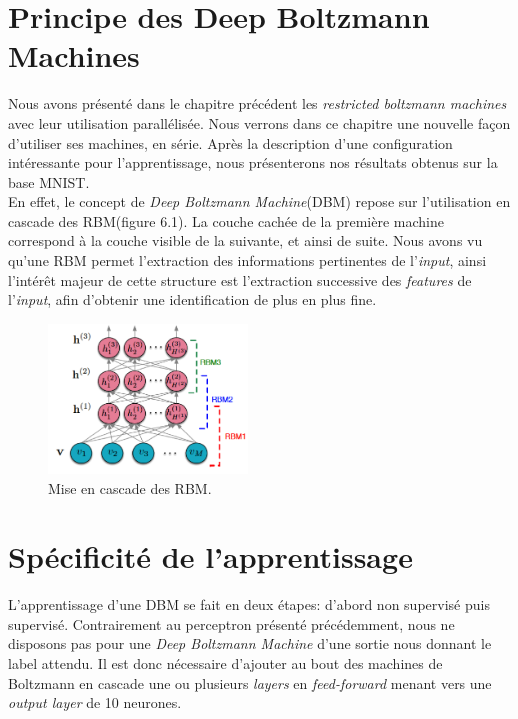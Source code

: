 \documentclass[a4paper,oneside]{report}
\begin{document}
	\section{Principe des Deep Boltzmann Machines}

		Nous avons présenté dans le chapitre précédent les \textit{restricted boltzmann machines} avec leur utilisation parallélisée. 
		Nous verrons dans ce chapitre une nouvelle façon d'utiliser ses machines, en série. Après la description d'une configuration intéressante pour l'apprentissage, nous présenterons nos résultats obtenus sur la base MNIST.\\


		En effet, le concept de \textit{Deep Boltzmann Machine}(DBM) repose sur l'utilisation en cascade des RBM(figure 6.1). La couche cachée de la première machine correspond à la couche visible de la suivante, et ainsi de suite. Nous avons vu qu'une RBM permet l'extraction des informations pertinentes de l'\textit{input}, ainsi l'intérêt majeur de cette structure est l'extraction successive des \textit{features} de l'\textit{input}, afin d'obtenir une identification de plus en plus fine.

                \begin{figure}
                    \begin{center}
                        \includegraphics[width=200px]{Images/DBN.png}
                    \end{center}
                    \caption{Mise en cascade des RBM.}
                \end{figure}


	\section{Spécificité de l'apprentissage}


		L'apprentissage d'une DBM se fait en deux étapes: d'abord non supervisé puis supervisé.
		Contrairement au perceptron présenté précédemment, nous ne disposons pas pour une \textit{Deep Boltzmann Machine} d'une sortie nous donnant le label attendu. Il est donc nécessaire d'ajouter au bout des machines de 					Boltzmann en cascade une ou plusieurs\textit{ layers} en \textit{feed-forward} menant vers une \textit{output layer} de 10 neurones.\\
\end{document}
